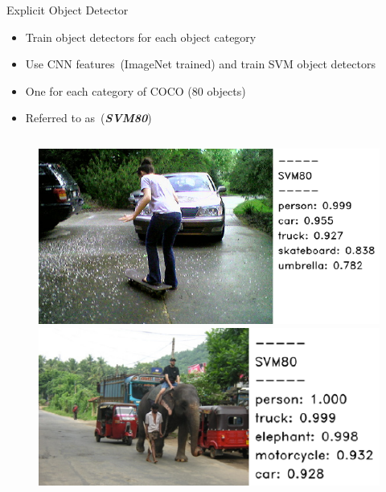 \documentclass{beamer}
\begin{document}
\begin{frame}{Explicit Object Detector}
    \begin{itemize}
        \item Train object detectors for each object category 
        \item Use CNN features~(ImageNet trained) and train SVM object detectors 
        \item One for each category of COCO (80 objects) 
        \item Referred to as~(\textbf{\emph{SVM80}})  
    \end{itemize}
  \begin{figure}[h]
    \begin{columns}
    \centering
    \includegraphics[width=1.0\textwidth]{images/16285.pdf}
    \hspace{-5mm}
    \centering
    \includegraphics[width=1.0\textwidth]{images/450728.pdf}
    \end{columns}
  \end{figure}
\end{frame}
\end{document}
